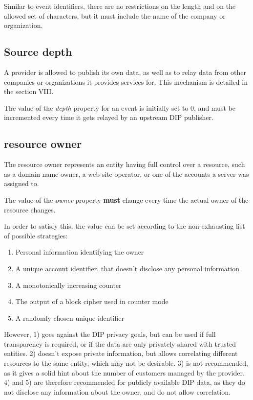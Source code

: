 \documentclass[conference]{IEEEtran}
\begin{document}
Similar to event identifiers, there are no restrictions on the length and on the allowed set of characters, but it must include the name of the company or organization.

\subsection{Source depth}

A provider is allowed to publish its own data, as well as to relay data from other companies or organizations it provides services for. This mechanism is detailed in the  section VIII.

The value of the \emph{depth} property for an event is initially set to 0, and must be incremented every time it gets relayed by an upstream DIP publisher.

\subsection{resource owner}

The resource owner represents an entity having full control over a resource, such as a domain name owner, a web site operator, or one of the accounts a server was assigned to.

\vspace{1em}
The value of the \emph{owner} property \textbf{must} change every time the actual owner of the resource changes.
\vspace{1em}

In order to satisfy this, the value can be set according to the non-exhausting list of possible strategies:
\begin{enumerate}
	\item Personal information identifying the owner
	\item A unique account identifier, that doesn't disclose any personal information
	\item A monotonically increasing counter
	\item The output of a block cipher used in counter mode
	\item A randomly chosen unique identifier
\end{enumerate}

However, 1) goes against the DIP privacy goals, but can be used if full transparency is required, or if the data are only privately shared with trusted entities.
2) doesn't expose private information, but allows correlating different resources to the same entity, which may not be desirable.
3) is not recommended, as it gives a solid hint about the number of customers managed by the provider.
4) and 5) are therefore recommended for publicly available DIP data, as they do not disclose any information about the owner, and do not allow correlation.
\end{document}
